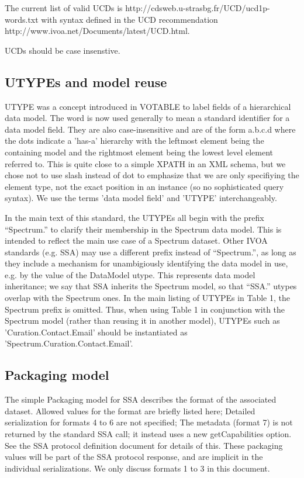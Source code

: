 \documentclass[11pt]{article}
\begin{document}
The current list of valid UCDs is
http://cdsweb.u-strasbg.fr/UCD/ucd1p-words.txt
with syntax defined in the UCD recommendation
http://www.ivoa.net/Documents/latest/UCD.html.

UCDs should be case insenstive.


\subsection{UTYPEs and model reuse}

UTYPE was a concept introduced in VOTABLE to label fields of a hierarchical
data model. The word is now used generally to mean a standard identifier
for a data model field. They are also case-insensitive and are of the
form a.b.c.d  where the dots indicate a 'has-a' hierarchy
with the leftmost element being the containing model and the rightmost
element being the lowest level element referred to. This is quite close
to a simple XPATH in an XML schema, but we chose not to use slash instead of
dot to emphasize that we are only specifiying the element type, not the
exact position in an instance (so no sophisticated query syntax).
We use the terms 'data model field' and 'UTYPE' interchangeably.

In the main text of this standard, the UTYPEs all begin with the prefix ``Spectrum.'' to
clarify their membership in the Spectrum data model. This
is intended to reflect the main use case of a Spectrum dataset. Other IVOA standards
(e.g. SSA) may use a different prefix instead of ``Spectrum.'', as long as they
include a mechanism for unambigiously identifying the data model in use,
e.g. by the value of the DataModel utype. This represents data model inheritance;
we say that SSA inherits the Spectrum model, so that ``SSA.'' utypes overlap
with the Spectrum ones. In the main listing of UTYPEs in Table 1, the Spectrum prefix is omitted.
Thus, when using Table 1 in conjunction with the Spectrum model (rather than reusing it in another
model), UTYPEs such as  'Curation.Contact.Email' should be instantiated as 'Spectrum.Curation.Contact.Email'.

\subsection{Packaging model}

The simple Packaging model for SSA 
describes the format of the associated dataset.
Allowed values for the format are briefly listed here;
Detailed serialization for
formats 4 to 6 are not specified;
The metadata (format 7)
is not returned by the standard SSA call; it instead uses a new getCapabilities option. 
See the SSA protocol definition document for details of this.
These packaging values will be part of the SSA protocol response,
and are implicit in the individual serializations. We only discuss formats 1 to 3
in this document.
\end{document}
